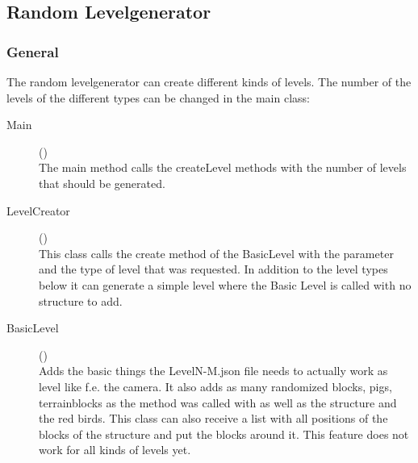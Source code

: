 \subsection{Random Levelgenerator}
\label{Random LevelGenerator}
\subsubsection{General}
	The random levelgenerator can create different kinds of levels. The number of the levels of the different types can be changed in the main class:
	\begin{description}
		\item[Main]()\\
			The main method calls the createLevel methods with the number of levels that should be generated. 
		\item[LevelCreator]()\\
			This class calls the create method of the BasicLevel with the parameter and the type of level that was requested. In addition to the level types below it can generate a simple level where the Basic Level is called with no structure to add.
		\item[BasicLevel]()\\
			Adds the basic things the LevelN-M.json file needs to actually work as level like f.e. the camera.
			It also adds as many randomized blocks, pigs, terrainblocks as the method was called with as well as the structure and the red birds.
			This class can also receive a list with all positions of the blocks of the structure and put the blocks around it. This feature does not work for all kinds of levels yet. 
	\end{description}
